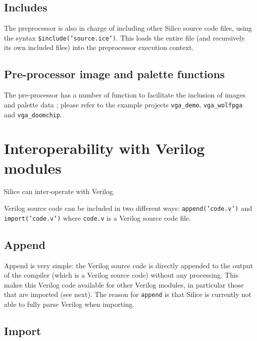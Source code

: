 \documentclass[a4]{article}
\newcommand\verilog{Verilog}
\newcommand\silice{Silice}
\begin{document}

\subsection{Includes}

The preprocessor is also in charge of including other Silice source code files,
using the syntax \texttt{\$include('source.ice')}. This loads the entire file
(and recursively its own included files) into the preprocessor execution context.


\subsection{Pre-processor image and palette functions}

The pre-processor has a number of function to facilitate the inclusion of images
and palette data ; please refer to the example projects \texttt{vga\_demo}, \texttt{vga\_wolfpga} and \texttt{vga\_doomchip}.


\section{Interoperability with \verilog{} modules}

\silice{} can inter-operate with \verilog{}.

\verilog{} source code can be included in two different ways: \texttt{append('code.v')} and \texttt{import('code.v')} where \texttt{code.v} is a \verilog{} source code file.

\subsection{Append}

Append is very simple: the \verilog{} source code is directly appended to the output of the compiler (which is a \verilog{} source code) without any processing. This makes this \verilog{} code available for other \verilog{} modules, in particular those that are imported (see next). The reason for \texttt{append} is that \silice{} is currently not able to fully parse \verilog{} when importing. 

\subsection{Import}
\end{document}
